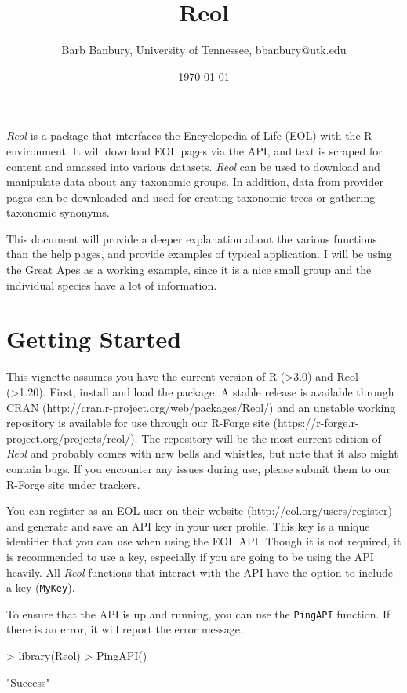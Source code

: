 \documentclass[12pt]{article}
\title{Reol}
\author{Barb Banbury, University of Tennessee, bbanbury@utk.edu}
\date{\today}
\begin{document}
\maketitle



\textit{Reol} is a package that interfaces the Encyclopedia of Life (EOL) with the R environment. It will download EOL pages via the API, and text is scraped for content and amassed into various datasets. \textit{Reol} can be used to download and manipulate data about any taxonomic groups. In addition, data from provider pages can be downloaded and used for creating taxonomic trees or gathering taxonomic synonyms. 

This document will provide a deeper explanation about the various functions than the help pages, and provide examples of typical application. I will be using the Great Apes as a working example, since it is a nice small group and the individual species have a lot of information.  

 
 \section{Getting Started}
This vignette assumes you have the current version of R (>3.0) and Reol (>1.20). First, install and load the package. A stable release is available through CRAN (http://cran.r-project.org/web/packages/Reol/) and an unstable working repository is available for use through our R-Forge site (https://r-forge.r-project.org/projects/reol/). The repository will be the most current edition of \textit{Reol} and probably comes with new bells and whistles, but note that it also might contain bugs. If you encounter any issues during use, please submit them to our R-Forge site under trackers. 

You can register as an EOL user on their website (http://eol.org/users/register) and generate and save an API key in your user profile. This key is a unique identifier that you can use when using the EOL API. Though it is not required, it is recommended to use a key, especially if you are going to be using the API heavily. All \textit{Reol} functions that interact with the API have the option to include a key (\texttt{MyKey}). 

To ensure that the API is up and running, you can use the \texttt{PingAPI} function. If there is an error, it will report the error message. 
\begin{Schunk}
\begin{Sinput}
> library(Reol)
> PingAPI()
\end{Sinput}
\begin{Soutput}
[1] "Success"
\end{Soutput}
\end{Schunk}
\end{document}
